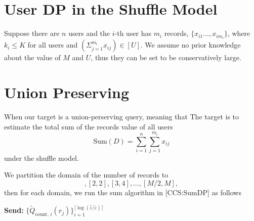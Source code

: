 \section{User DP in the Shuffle Model}
Suppose there are $n$ users and the $i$-th user has $m_i$ records, $\{x_{i1}\ldots, x_{im_i}\}$, where $k_i\leq K$ for all users and $(\Sigma_{j=1}^{m_i} x_{ij}) \in [U]$. 
We assume no prior knowledge about the value of $M$ and $U$, thus they can be set to be conservatively large.

\section{Union Preserving}
When our target is a union-perserving query, meaning that 
The target is to estimate the total sum of the records value of all users
\begin{equation*}
    \text{Sum}(D)=\sum_{i=1}^{n}\sum_{j=1}^{m_i}x_{ij}
\end{equation*}
under the shuffle model.

We partition the domain of the number of records to 
\begin{equation*}
    [1,1], [2,2], [3,4],\ldots,[M/2, M],
\end{equation*}
then for each domain, we run the sum algorithm in [CCS:SumDP] as follows


\begin{algorithm}[t]
\LinesNumbered
\caption{SumUserShuffleDP (Randomizer)}
\label{alg:user_shuffle_sum_randomizer}


\textbf{Send:} $\{\widetilde{Q}_{\text{count},\, i}(r_j)\}_{i=1}^{\lceil \log(\hat{\varepsilon}/\check{\varepsilon})\rceil}$
\end{algorithm}


